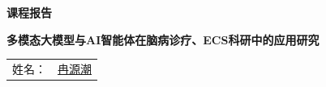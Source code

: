 \begin{titlepage}
\centering
\vspace*{2.5cm}
{\bfseries 课程报告\par}\vspace{1.2cm}
{\bfseries 多模态大模型与AI智能体在脑病诊疗、ECS科研中的应用研究\par}
\vfill
\begin{tabular}{rl}
姓名：& \underline{冉源潮\hspace{7em}}\\[0.5em]
\end{tabular}\par\vspace{1.5cm}
\vfill
\end{titlepage}
